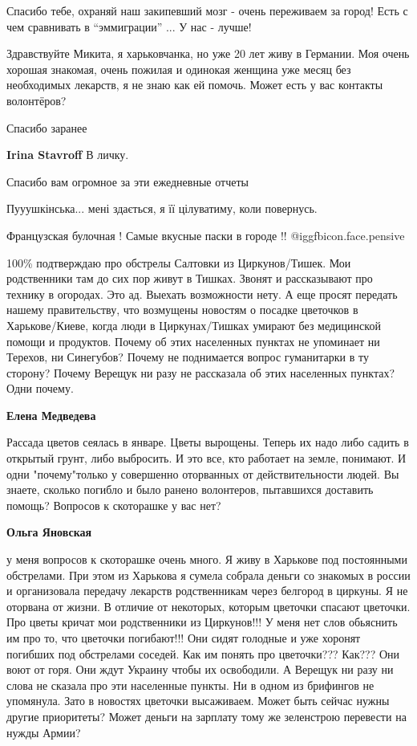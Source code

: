 \begin{itemize}
Спасибо тебе, охраняй наш закипевший мозг - очень переживаем за город! Есть с
чем сравнивать в \enquote{эммиграции} ... У нас - лучше!


Здравствуйте Микита, я харьковчанка, но уже 20 лет живу в Германии. Моя очень
хорошая знакомая, очень пожилая и одинокая женщина уже месяц без необходимых
лекарств, я не знаю как ей помочь. Может есть у вас контакты волонтёров?

Спасибо заранее

\textbf{Irina Stavroff} В личку.

Спасибо вам огромное за эти ежедневные отчеты

Пууушкінська... мені здається, я її цілуватиму, коли повернусь.

Французская булочная ! Самые вкусные паски в городе !! @igg{fbicon.face.pensive} 


100\% подтверждаю про обстрелы Салтовки из Циркунов/Тишек. Мои родственники там
до сих пор живут в Тишках. Звонят и рассказывают про технику в огородах. Это
ад. Выехать возможности нету. А еще просят передать нашему правительству, что
возмущены новостям о посадке цветочков в Харькове/Киеве, когда люди в
Циркунах/Тишках умирают без медицинской помощи и продуктов. Почему об этих
населенных пунктах не упоминает ни Терехов, ни Синегубов? Почему не поднимается
вопрос гуманитарки в ту сторону? Почему Верещук ни разу не рассказала об этих
населенных пунктах? Одни почему.

\begin{itemize} %
\textbf{Елена Медведева} 

Рассада цветов сеялась в январе. Цветы вырощены. Теперь их надо либо садить в
открытый грунт, либо выбросить. И это все, кто работает на земле, понимают. И одни
"почему"только у совершенно оторванных от действительности людей. Вы знаете,
сколько погибло и было ранено волонтеров, пытавшихся доставить помощь? Вопросов
к скоторашке у вас нет?

\textbf{Ольга Яновская} 

у меня вопросов к скоторашке очень много. Я живу в Харькове под постоянными
обстрелами. При этом из Харькова я сумела собрала деньги со знакомых в россии и
организовала передачу лекарств родственникам через белгород в циркуны. Я не
оторвана от жизни. В отличие от некоторых, которым цветочки спасают цветочки.
Про цветы кричат мои родственники из Циркунов!!! У меня нет слов обьяснить им
про то, что цветочки погибают!!! Они сидят голодные и уже хоронят погибших под
обстрелами соседей. Как им понять про цветочки??? Как??? Они воют от горя. Они
ждут Украину чтобы их освободили. А Верещук ни разу ни слова не сказала про эти
населенные пункты. Ни в одном из брифингов не упомянула. Зато в новостях
цветочки высаживаем. Может быть сейчас нужны другие приоритеты? Может деньги на
зарплату тому же зеленстрою перевести на нужды Армии?


\end{itemize}
\end{itemize}
